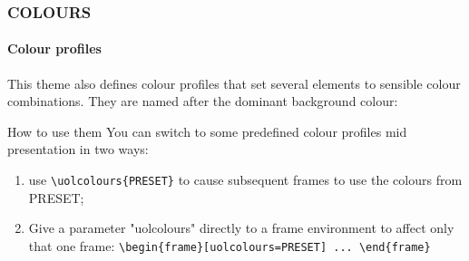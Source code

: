 \documentclass[
aspectratio=169,
]{beamer}
\begin{document}
    \begin{frame}[t,fragile]
    \frametitle{COLOURS}
    \framesubtitle{Colour profiles}

    \begin{block}{}
    This theme also defines colour profiles that 
    set several elements to sensible colour combinations.
    They are named after the dominant background colour:

    \end{block}




    \begin{block}{How to use them}
 You can switch to some predefined colour profiles mid presentation in two ways:
 \begin{enumerate}
     \item use \verb|\uolcolours{PRESET}| to cause subsequent frames to use the colours from PRESET;
     \item 
         Give a parameter "uolcolours" directly to a frame environment to affect only that one frame:
         \verb|\begin{frame}[uolcolours=PRESET] ... \end{frame}|
 \end{enumerate}
    \end{block}
\end{frame}
\end{document}
